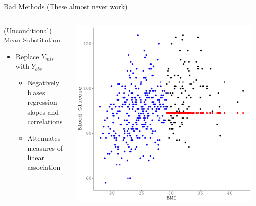 \documentclass{beamer}\usepackage[]{graphicx}\usepackage[]{color}
\makeatletter
\def\maxwidth{ %
  \ifdim\Gin@nat@width>\linewidth
    \linewidth
  \else
    \Gin@nat@width
  \fi
}
\newenvironment{knitrout}{}{} %
\makeatother
\begin{document}

\begin{frame}{Bad Methods (These almost never work)}
  
  \begin{columns}
    \begin{column}{0.5\textwidth}
      
      (Unconditional) Mean Substitution
      \begin{itemize}
      \item Replace $Y_{mis}$ with $\bar{Y}_{obs}$
        \begin{itemize}
        \item Negatively biases regression slopes and correlations
        \item Attenuates measures of linear association
        \end{itemize}
      \end{itemize}
      
    \end{column}
    \begin{column}{0.5\textwidth}
      
\begin{knitrout}\footnotesize
{}\color{fgcolor}

{\centering \includegraphics[width=\maxwidth]{figure/intro-unnamed-chunk-22-1} 

}


\end{knitrout}

\end{column}
\end{columns}

\end{frame}
\end{document}
